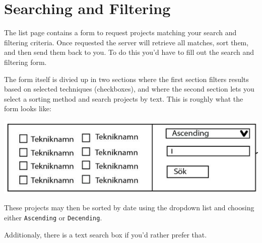\documentclass{TDP003mall}
\begin{document}
\section{Searching and Filtering}\label{searching-and-filtering}

The list page contains a form to request projects matching your search and filtering criteria. Once requested the server will retrieve all matches, sort them, and then send them back to you. To do this you'd have to fill out the search and filtering form.

The form itself is divied up in two sections where the first section filters results based on selected techniques (checkboxes), and where the second section lets you select a sorting method and search projects by text. This is roughly what the form looks like:

\includegraphics[width=\textwidth]{search_box}

These projects may then be sorted by date using the dropdown list and
choosing either \texttt{Ascending} or \texttt{Decending}.

Additionaly, there is a text search box if you'd rather prefer that.
\end{document}
